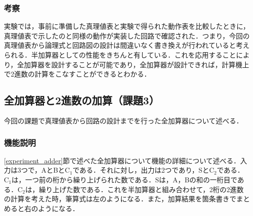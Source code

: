 %
%
\subsubsection{考察}
\label{halfadder_kousatu}
実験では，事前に準備した真理値表と実験で得られた動作表を比較したときに，真理値表で示したのと同様の動作が実装した回路で確認された．つまり，今回の真理値表から論理式と回路図の設計は間違いなく書き換えが行われていると考えられる．半加算器としての性能をきちんと有している．これを応用することにより，全加算器を設計することが可能であり，全加算器が設計できれば，計算機上で2進数の計算をこなすことができるとわかる．

%
%
\subsection{全加算器と2進数の加算（課題3）}
\label{experiment_fulladder}
今回の課題で真理値表から回路の設計までを行った全加算器について述べる．

%
%
\subsubsection{機能説明}
\label{fulladder_explain}
\ref{experiment_adder}節で述べた全加算器について機能の詳細について述べる．入力は3つで，AとBと$\mathrm{C_1}$である．それに対し，出力は2つであり，Sと$\mathrm{C_2}$である．$\mathrm{C_1}$は，一つ前の桁から繰り上げられた数である．Sは，A，Bの和の一桁目である．$\mathrm{C_2}$は，繰り上げた数である．これを半加算器と組み合わせて，2桁の2進数の計算を考えた時，筆算式は左のようになる．また，加算結果を箇条書きでまとめると右のようになる．

